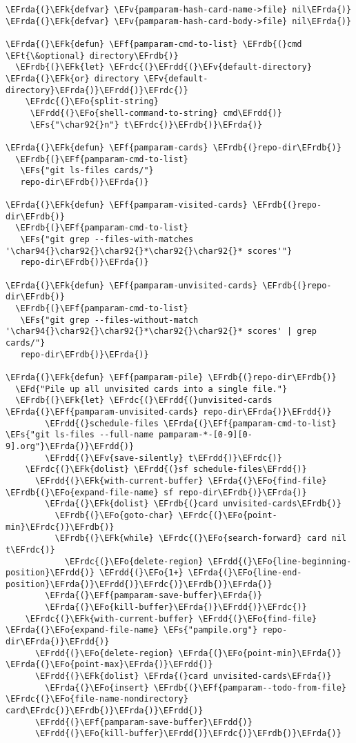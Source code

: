 \documentclass[a4wide,10pt]{article}
\newcommand{\EFs}[1]{\textcolor{EFs}{#1}} %
\newcommand{\EFd}[1]{\textcolor{EFd}{#1}} %
\newcommand{\EFk}[1]{\textcolor{EFk}{#1}} %
\newcommand{\EFf}[1]{\textcolor{EFf}{#1}} %
\newcommand{\EFv}[1]{\textcolor{EFv}{#1}} %
\newcommand{\EFt}[1]{\textcolor{EFt}{#1}} %
\newcommand{\EFo}[1]{\textcolor{EFo}{#1}} %
\newcommand{\EFrda}[1]{\textcolor{EFrda}{#1}} %
\newcommand{\EFrdb}[1]{\textcolor{EFrdb}{#1}} %
\newcommand{\EFrdc}[1]{\textcolor{EFrdc}{#1}} %
\newcommand{\EFrdd}[1]{\textcolor{EFrdd}{#1}} %
\begin{document}
\begin{Code}
\begin{Verbatim}
\EFrda{(}\EFk{defvar} \EFv{pamparam-hash-card-name->file} nil\EFrda{)}
\EFrda{(}\EFk{defvar} \EFv{pamparam-hash-card-body->file} nil\EFrda{)}

\EFrda{(}\EFk{defun} \EFf{pamparam-cmd-to-list} \EFrdb{(}cmd \EFt{\&optional} directory\EFrdb{)}
  \EFrdb{(}\EFk{let} \EFrdc{(}\EFrdd{(}\EFv{default-directory} \EFrda{(}\EFk{or} directory \EFv{default-directory}\EFrda{)}\EFrdd{)}\EFrdc{)}
    \EFrdc{(}\EFo{split-string}
     \EFrdd{(}\EFo{shell-command-to-string} cmd\EFrdd{)}
     \EFs{"\char92{}n"} t\EFrdc{)}\EFrdb{)}\EFrda{)}

\EFrda{(}\EFk{defun} \EFf{pamparam-cards} \EFrdb{(}repo-dir\EFrdb{)}
  \EFrdb{(}\EFf{pamparam-cmd-to-list}
   \EFs{"git ls-files cards/"}
   repo-dir\EFrdb{)}\EFrda{)}

\EFrda{(}\EFk{defun} \EFf{pamparam-visited-cards} \EFrdb{(}repo-dir\EFrdb{)}
  \EFrdb{(}\EFf{pamparam-cmd-to-list}
   \EFs{"git grep --files-with-matches '\char94{}\char92{}\char92{}*\char92{}\char92{}* scores'"}
   repo-dir\EFrdb{)}\EFrda{)}

\EFrda{(}\EFk{defun} \EFf{pamparam-unvisited-cards} \EFrdb{(}repo-dir\EFrdb{)}
  \EFrdb{(}\EFf{pamparam-cmd-to-list}
   \EFs{"git grep --files-without-match '\char94{}\char92{}\char92{}*\char92{}\char92{}* scores' | grep cards/"}
   repo-dir\EFrdb{)}\EFrda{)}

\EFrda{(}\EFk{defun} \EFf{pamparam-pile} \EFrdb{(}repo-dir\EFrdb{)}
  \EFd{"Pile up all unvisited cards into a single file."}
  \EFrdb{(}\EFk{let} \EFrdc{(}\EFrdd{(}unvisited-cards \EFrda{(}\EFf{pamparam-unvisited-cards} repo-dir\EFrda{)}\EFrdd{)}
        \EFrdd{(}schedule-files \EFrda{(}\EFf{pamparam-cmd-to-list} \EFs{"git ls-files --full-name pamparam-*-[0-9][0-9].org"}\EFrda{)}\EFrdd{)}
        \EFrdd{(}\EFv{save-silently} t\EFrdd{)}\EFrdc{)}
    \EFrdc{(}\EFk{dolist} \EFrdd{(}sf schedule-files\EFrdd{)}
      \EFrdd{(}\EFk{with-current-buffer} \EFrda{(}\EFo{find-file} \EFrdb{(}\EFo{expand-file-name} sf repo-dir\EFrdb{)}\EFrda{)}
        \EFrda{(}\EFk{dolist} \EFrdb{(}card unvisited-cards\EFrdb{)}
          \EFrdb{(}\EFo{goto-char} \EFrdc{(}\EFo{point-min}\EFrdc{)}\EFrdb{)}
          \EFrdb{(}\EFk{while} \EFrdc{(}\EFo{search-forward} card nil t\EFrdc{)}
            \EFrdc{(}\EFo{delete-region} \EFrdd{(}\EFo{line-beginning-position}\EFrdd{)} \EFrdd{(}\EFo{1+} \EFrda{(}\EFo{line-end-position}\EFrda{)}\EFrdd{)}\EFrdc{)}\EFrdb{)}\EFrda{)}
        \EFrda{(}\EFf{pamparam-save-buffer}\EFrda{)}
        \EFrda{(}\EFo{kill-buffer}\EFrda{)}\EFrdd{)}\EFrdc{)}
    \EFrdc{(}\EFk{with-current-buffer} \EFrdd{(}\EFo{find-file} \EFrda{(}\EFo{expand-file-name} \EFs{"pampile.org"} repo-dir\EFrda{)}\EFrdd{)}
      \EFrdd{(}\EFo{delete-region} \EFrda{(}\EFo{point-min}\EFrda{)} \EFrda{(}\EFo{point-max}\EFrda{)}\EFrdd{)}
      \EFrdd{(}\EFk{dolist} \EFrda{(}card unvisited-cards\EFrda{)}
        \EFrda{(}\EFo{insert} \EFrdb{(}\EFf{pamparam--todo-from-file} \EFrdc{(}\EFo{file-name-nondirectory} card\EFrdc{)}\EFrdb{)}\EFrda{)}\EFrdd{)}
      \EFrdd{(}\EFf{pamparam-save-buffer}\EFrdd{)}
      \EFrdd{(}\EFo{kill-buffer}\EFrdd{)}\EFrdc{)}\EFrdb{)}\EFrda{)}


\end{Verbatim}
\end{Code}
\end{document}
